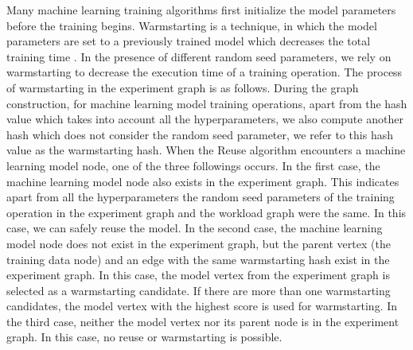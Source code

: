 Many machine learning training algorithms first initialize the model parameters before the training begins. 
Warmstarting is a technique, in which the model parameters are set to a previously trained model which decreases the total training time \cite{baylor2017tfx}.
In the presence of different random seed parameters, we rely on warmstarting to decrease the execution time of a training operation.
The process of warmstarting in the experiment graph is as follows.
During the graph construction, for machine learning model training operations, apart from the hash value which takes into account all the hyperparameters, we also compute another hash which does not consider the random seed parameter, we refer to this hash value as the warmstarting hash.
When the Reuse algorithm encounters a machine learning model node, one of the three followings occurs.
In the first case, the machine learning model node also exists in the experiment graph. 
This indicates apart from all the hyperparameters the random seed parameters of the training operation in the experiment graph and the workload graph were the same.
In this case, we can safely reuse the model.
In the second case, the machine learning model node does not exist in the experiment graph, but the parent vertex (the training data node) and an edge with the same warmstarting hash exist in the experiment graph.
In this case, the model vertex from the experiment graph is selected as a warmstarting candidate.
If there are more than one warmstarting candidates, the model vertex with the highest score is used for warmstarting.
In the third case, neither the model vertex nor its parent node is in the experiment graph.
In this case, no reuse or warmstarting is possible.



